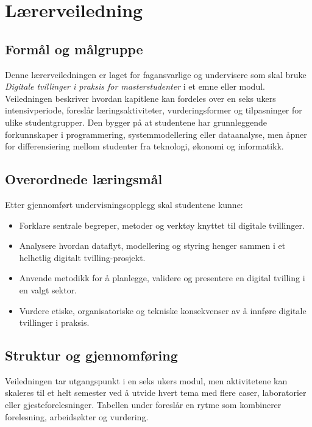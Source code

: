 
\chapter{Lærerveiledning}

\section{Formål og målgruppe}
Denne lærerveiledningen er laget for fagansvarlige og undervisere som skal bruke \emph{Digitale tvillinger i praksis for masterstudenter} i et emne eller modul. Veiledningen beskriver hvordan kapitlene kan fordeles over en seks ukers intensivperiode, foreslår læringsaktiviteter, vurderingsformer og tilpasninger for ulike studentgrupper. Den bygger på at studentene har grunnleggende forkunnskaper i programmering, systemmodellering eller dataanalyse, men åpner for differensiering mellom studenter fra teknologi, økonomi og informatikk.

\section{Overordnede læringsmål}
Etter gjennomført undervisningsopplegg skal studentene kunne:
\begin{itemize}
    \item Forklare sentrale begreper, metoder og verktøy knyttet til digitale tvillinger.
    \item Analysere hvordan dataflyt, modellering og styring henger sammen i et helhetlig digitalt tvilling-prosjekt.
    \item Anvende metodikk for å planlegge, validere og presentere en digital tvilling i en valgt sektor.
    \item Vurdere etiske, organisatoriske og tekniske konsekvenser av å innføre digitale tvillinger i praksis.
\end{itemize}

\section{Struktur og gjennomføring}
Veiledningen tar utgangspunkt i en seks ukers modul, men aktivitetene kan skaleres til et helt semester ved å utvide hvert tema med flere caser, laboratorier eller gjesteforelesninger. Tabellen under foreslår en rytme som kombinerer forelesning, arbeidsøkter og vurdering.

